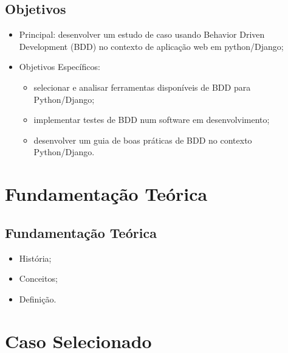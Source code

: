\documentclass{beamer}
\begin{document}
\subsection{Objetivos}
\begin{frame}
  \begin{itemize}
    \item Principal: desenvolver um estudo de caso usando Behavior Driven Development (BDD) no contexto de aplicação web em python/Django;
    \item Objetivos Específicos:
        \begin{itemize}
            \item selecionar e analisar ferramentas disponíveis de BDD para Python/Django;
            \item implementar testes de BDD num software em desenvolvimento;
            \item desenvolver um guia de boas práticas de BDD no contexto Python/Django.
        \end{itemize}
  \end{itemize}
\end{frame}

\section{Fundamentação Teórica} %
\subsection{Fundamentação Teórica}
\begin{frame}
  \begin{itemize}
      \item História;  
      \item Conceitos;
      \item Definição.
  \end{itemize}
\end{frame}

\section{Caso Selecionado} %
\end{document}
